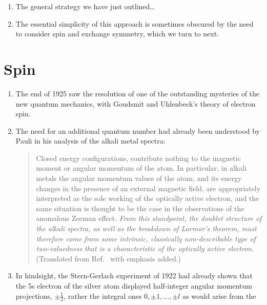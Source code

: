 \begin{enumerate}
    \item
        The general strategy we have just outlined\dots
    \item
        The essential simplicity of this approach is sometimes obscured by the
        need to consider spin and exchange symmetry, which we turn to next.
\end{enumerate}


\section{Spin}

\begin{enumerate}
    \item
        The end of 1925 saw the resolution of one of the outstanding mysteries
        of the new quantum mechanics, with Goudsmit and Uhlenbeck's theory of
        electron spin.\cite{Uhlenbeck:1925p953}
    \item
        The need for an additional quantum number had already been understood by
        Pauli in his analysis of the alkali metal spectra:
        \begin{quote}
            Closed energy configurations, contribute nothing to the magnetic
            moment or angular momentum of the atom.
            In particular, in alkali metals the angular momentum values of the
            atom, and its energy changes in the presence of an external magnetic
            field, are appropriately interpreted as the sole working of the
            optically active electron, and the same situation is thought to be
            the case in the observations of the anomalous Zeeman effect.
            \emph{%
                From this standpoint, the doublet structure of the alkali
                spectra, as well as the breakdown of Larmor's theorem, must
                therefore come from some intrinsic, classically non-describable
                type of two-valuedness that is a characteristic of the optically
                active electron.
            }
            (Translated from Ref.~ with emphasis added.)
        \end{quote}
    \item
        In hindsight, the Stern-Gerlach experiment\cite{Gerlach:1922p349} of
        1922 had already shown that the 5s electron of the silver atom displayed
        half-integer angular momentum projections, \(\pm \tfrac{1}{2}\), rather
        the integral ones \(0, \pm1, \dots, \pm l\) as would arise from the

\end{enumerate}
